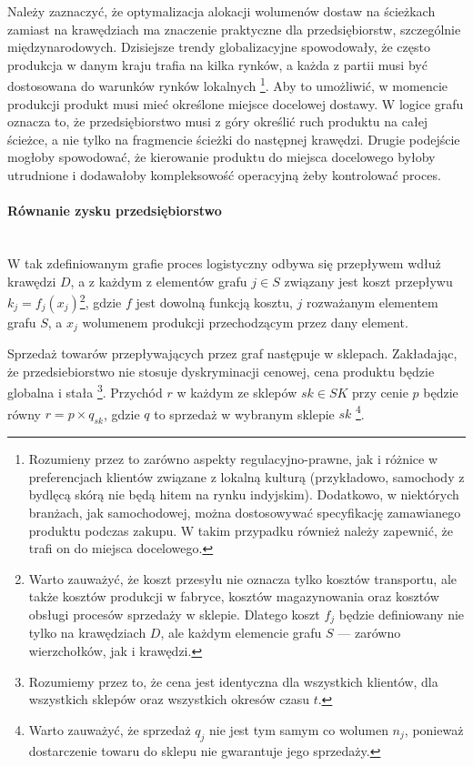 \documentclass[polish, twoside, 12pt, a4paper]{article}
\theoremstyle{definition}
\theoremstyle{plain}
\theoremstyle{remark}
\begin{document}
Należy zaznaczyć, że optymalizacja alokacji wolumenów dostaw na ścieżkach zamiast na krawędziach ma znaczenie praktyczne dla przedsiębiorstw, szczególnie międzynarodowych. Dzisiejsze trendy globalizacyjne spowodowały, że często produkcja w danym kraju trafia na kilka rynków, a każda z partii musi być dostosowana do warunków rynków lokalnych \footnote{Rozumieny przez to zarówno aspekty regulacyjno-prawne, jak i różnice w preferencjach klientów związane z lokalną kulturą (przykładowo, samochody z bydlęcą skórą nie będą hitem na rynku indyjskim). Dodatkowo, w niektórych branżach, jak samochodowej, można dostosowywać specyfikację zamawianego produktu podczas zakupu. W takim przypadku również należy zapewnić, że trafi on do miejsca docelowego.}. Aby to umożliwić, w momencie produkcji produkt musi mieć określone miejsce docelowej dostawy. W logice grafu oznacza to, że przedsiębiorstwo musi z góry określić ruch produktu na całej ścieżce, a nie tylko na fragmencie ścieżki do następnej krawędzi. Drugie podejście mogłoby spowodować, że kierowanie produktu do miejsca docelowego byłoby utrudnione i dodawałoby kompleksowość operacyjną żeby kontrolować proces. 

\paragraph{Równanie zysku przedsiębiorstwo}\mbox{}\\

W tak zdefiniowanym grafie proces logistyczny odbywa się przepływem wdłuż krawędzi $D$, a z każdym z elementów grafu $ j \in S$ związany jest koszt przepływu $k_j = f_j(x_j)$\footnote{Warto zauważyć, że koszt przesyłu nie oznacza tylko kosztów transportu, ale także kosztów produkcji w fabryce, kosztów magazynowania oraz kosztów obsługi procesów sprzedaży w sklepie. Dlatego koszt $f_j$ będzie definiowany nie tylko na krawędziach $D$, ale każdym elemencie grafu $S$ --- zarówno wierzchołków, jak i krawędzi.}, gdzie $f$ jest dowolną funkcją kosztu, $j$ rozważanym elementem grafu $S$, a $x_j$ wolumenem produkcji przechodzącym przez dany element. 

Sprzedaż towarów przepływających przez graf następuje w sklepach. Zakładając, że przedsiebiorstwo nie stosuje dyskryminacji cenowej, cena produktu będzie globalna i stała \footnote{Rozumiemy przez to, że cena jest identyczna dla wszystkich klientów, dla wszystkich sklepów oraz wszystkich okresów czasu $t$.}. Przychód $r$ w każdym ze sklepów $sk \in SK$ przy cenie $p$ będzie równy $r = p \times q_{sk}$, gdzie $q$ to sprzedaż w wybranym sklepie $sk$ \footnote{Warto zauważyć, że sprzedaż $q_j$ nie jest tym samym co wolumen $n_j$, ponieważ dostarczenie towaru do sklepu nie gwarantuje jego sprzedaży.}. 
\end{document}
